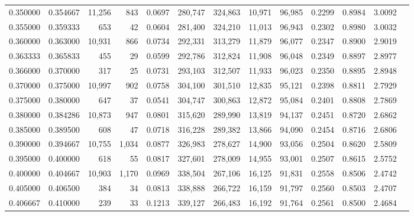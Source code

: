 \begin{tabular}{rrrrrrrrrrrrr}
0.350000 & 0.354667 & 11,256 &   843 &                                     0.0697 & 280,747 & 324,863 &  10,971 &  96,985 & 0.2299 & 0.8984 & 3.0092 \\
0.355000 & 0.359333 &    653 &    42 &                                     0.0604 & 281,400 & 324,210 &  11,013 &  96,943 & 0.2302 & 0.8980 & 3.0032 \\
0.360000 & 0.363000 & 10,931 &   866 &                                     0.0734 & 292,331 & 313,279 &  11,879 &  96,077 & 0.2347 & 0.8900 & 2.9019 \\
0.363333 & 0.365833 &    455 &    29 &                                     0.0599 & 292,786 & 312,824 &  11,908 &  96,048 & 0.2349 & 0.8897 & 2.8977 \\
0.366000 & 0.370000 &    317 &    25 &                                     0.0731 & 293,103 & 312,507 &  11,933 &  96,023 & 0.2350 & 0.8895 & 2.8948 \\
0.370000 & 0.375000 & 10,997 &   902 &                                     0.0758 & 304,100 & 301,510 &  12,835 &  95,121 & 0.2398 & 0.8811 & 2.7929 \\
0.375000 & 0.380000 &    647 &    37 &                                     0.0541 & 304,747 & 300,863 &  12,872 &  95,084 & 0.2401 & 0.8808 & 2.7869 \\
0.380000 & 0.384286 & 10,873 &   947 &                                     0.0801 & 315,620 & 289,990 &  13,819 &  94,137 & 0.2451 & 0.8720 & 2.6862 \\
0.385000 & 0.389500 &    608 &    47 &                                     0.0718 & 316,228 & 289,382 &  13,866 &  94,090 & 0.2454 & 0.8716 & 2.6806 \\
0.390000 & 0.394667 & 10,755 & 1,034 &                                     0.0877 & 326,983 & 278,627 &  14,900 &  93,056 & 0.2504 & 0.8620 & 2.5809 \\
0.395000 & 0.400000 &    618 &    55 &                                     0.0817 & 327,601 & 278,009 &  14,955 &  93,001 & 0.2507 & 0.8615 & 2.5752 \\
0.400000 & 0.404667 & 10,903 & 1,170 &                                     0.0969 & 338,504 & 267,106 &  16,125 &  91,831 & 0.2558 & 0.8506 & 2.4742 \\
0.405000 & 0.406500 &    384 &    34 &                                     0.0813 & 338,888 & 266,722 &  16,159 &  91,797 & 0.2560 & 0.8503 & 2.4707 \\
0.406667 & 0.410000 &    239 &    33 &                                     0.1213 & 339,127 & 266,483 &  16,192 &  91,764 & 0.2561 & 0.8500 & 2.4684 \\

\end{tabular}
